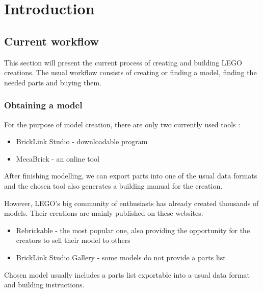 \chapter{Introduction}
\label{chap:analysis}



\section{Current workflow}
\label{sec:workflow}

This section will present the current process of creating and building LEGO creations. The usual workflow consists of creating or finding a model, finding the needed parts and buying them.

\subsection{Obtaining a model}

For the purpose of model creation, there are only two currently used tools :
\begin{itemize}
    \item BrickLink Studio  - downloadable program
    \item MecaBrick - an online tool
\end{itemize}

\noindent After finishing modelling, we can export parts into one of the usual data formats  and the chosen tool also generates a building manual for the creation.

 However, LEGO's big community of enthusiasts has already created thousands of models. Their creations are mainly published on these websites:

\begin{itemize}
    \item Rebrickable - the most popular one, also providing the opportunity for the creators to sell their model to others
    \item BrickLink Studio Gallery - some models do not provide a parts list
\end{itemize}

\noindent Chosen model usually includes a parts list exportable into a usual data format and building instructions.

